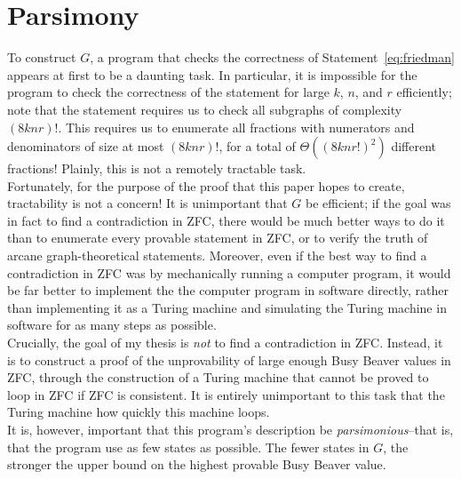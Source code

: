 \documentclass{report}
\begin{document}
\section{Parsimony}

To construct $G$, a program that checks the correctness of Statement~\ref{eq:friedman} appears at first to be a daunting task. In particular, it is impossible for the program to check the correctness of the statement for large $k$, $n$, and $r$ efficiently; note that the statement requires us to check all subgraphs of complexity $(8knr)!$. This requires us to enumerate all fractions with numerators and denominators of size at most $(8knr)!$, for a total of $\Theta((8knr!)^2)$ different fractions! Plainly, this is not a remotely tractable task. \\

Fortunately, for the purpose of the proof that this paper hopes to create, tractability is not a concern! It is unimportant that $G$ be efficient; if the goal was in fact to find a contradiction in ZFC, there would be much better ways to do it than to enumerate every provable statement in ZFC, or to verify the truth of arcane graph-theoretical statements. Moreover, even if the best way to find a contradiction in ZFC was by mechanically running a computer program, it would be far better to implement the the computer program in software directly, rather than implementing it as a Turing machine and simulating the Turing machine in software for as many steps as possible. \\

Crucially, the goal of my thesis is \emph{not} to find a contradiction in ZFC. Instead, it is to construct a proof of the unprovability of large enough Busy Beaver values in ZFC, through the construction of a Turing machine that cannot be proved to loop in ZFC if ZFC is consistent. It is entirely unimportant to this task that the Turing machine how quickly this machine loops. \\

It is, however, important that this program's description be \emph{parsimonious}--that is, that the program use as few states as possible. The fewer states in $G$, the stronger the upper bound on the highest provable Busy Beaver value. \\
\end{document}
